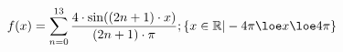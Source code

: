 \documentclass[preview]{standalone}
\begin{document}
\begin{align*}
f(x) = \sum_{n=0}^{13} \frac{4 \cdot \sin ((2n + 1) \cdot x) }{ (2n + 1) \cdot \pi}                 ; \{ x \in \mathbb{R} | -4 \pi \loe x \loe 4 \pi \}
\end{align*}
\end{document}
